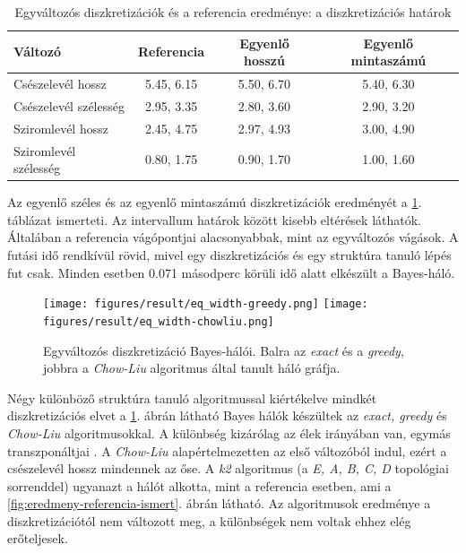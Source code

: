 \begin{table}[htp]\centering
    \begin{tabular}{lccc}
        Változó               & Referencia & Egyenlő hosszú & Egyenlő mintaszámú \\ \hline
        Csészelevél hossz     & 5.45, 6.15 & 5.50, 6.70     & 5.40, 6.30                              \\
        Csészelevél szélesség & 2.95, 3.35 & 2.80, 3.60     & 2.90, 3.20                              \\
        Sziromlevél hossz     & 2.45, 4.75 & 2.97, 4.93     & 3.00, 4.90                              \\
        Sziromlevél szélesség & 0.80, 1.75 & 0.90, 1.70     & 1.00, 1.60                              \\
    \end{tabular}
\caption{Egyváltozós diszkretizációk és a referencia eredménye: a diszkretizációs határok}
\label{tab:eredmeny-egyvaltozos}
\end{table}


Az egyenlő széles és az egyenlő mintaszámú diszkretizációk eredményét a \ref{tab:eredmeny-egyvaltozos}. táblázat ismerteti. Az intervallum határok között kisebb eltérések láthatók. Általában a referencia vágópontjai alacsonyabbak, mint az egyváltozós vágások. A futási idő rendkívül rövid, mivel egy diszkretizációs és egy struktúra tanuló lépés fut csak. Minden esetben 0.071 másodperc körüli idő alatt elkészült a Bayes-háló.

\begin{figure}[htp]
    \centering
    \texttt{[image: figures/result/eq\_width-greedy.png]} \hfill
    \texttt{[image: figures/result/eq\_width-chowliu.png]}
    \caption{Egyváltozós diszkretizáció Bayes-hálói. Balra az \emph{exact} és a \emph{greedy}, jobbra a \emph{Chow-Liu} algoritmus által tanult háló gráfja.}
    \label{fig:eredmeny-egyvaltozos}
\end{figure}

Négy különböző struktúra tanuló algoritmussal kiértékelve mindkét diszkretizációs elvet a \ref{fig:eredmeny-egyvaltozos}. ábrán látható Bayes hálók készültek az \emph{exact, greedy} és \emph{Chow-Liu} algoritmusokkal. A különbség kizárólag az élek irányában van, egymás transzponáltjai \cite{essam1970some}. A \emph{Chow-Liu} alapértelmezetten az első változóból indul, ezért a csészelevél hossz mindennek az őse. A \emph{k2} algoritmus (a \emph{E, A, B, C, D} topológiai sorrenddel) ugyanazt a hálót alkotta, mint a referencia esetben, ami a \ref{fig:eredmeny-referencia-ismert}. ábrán látható. Az algoritmusok eredménye a diszkretizációtól nem változott meg, a különbségek nem voltak ehhez elég erőteljesek.

